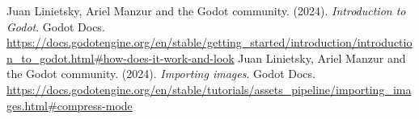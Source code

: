 
\begin{thebibliography}{99}
     Juan Linietsky, Ariel Manzur and the Godot community. (2024). \textit{Introduction to Godot}. Godot Docs. \url{https://docs.godotengine.org/en/stable/getting\_started/introduction/introduction\_to\_godot.html#how-does-it-work-and-look}
     Juan Linietsky, Ariel Manzur and the Godot community. (2024). \textit{Importing images}. Godot Docs. \url{https://docs.godotengine.org/en/stable/tutorials/assets\_pipeline/importing\_images.html#compress-mode}
\end{thebibliography}